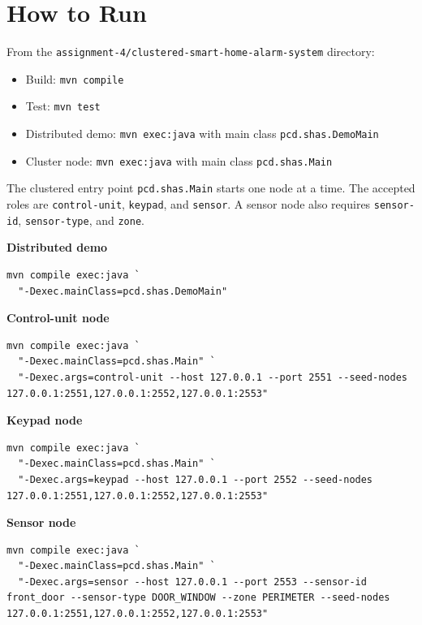 \clearpage
\section{How to Run}

From the \texttt{assignment-4/clustered-smart-home-alarm-system} directory:

\begin{itemize}
  \item Build: \texttt{mvn compile}
  \item Test: \texttt{mvn test}
  \item Distributed demo: \texttt{mvn exec:java} with main class \texttt{pcd.shas.DemoMain}
  \item Cluster node: \texttt{mvn exec:java} with main class \texttt{pcd.shas.Main}
\end{itemize}

The clustered entry point \texttt{pcd.shas.Main} starts one node at a time.
The accepted roles are \texttt{control-unit}, \texttt{keypad}, and
\texttt{sensor}. A sensor node also requires \texttt{sensor-id},
\texttt{sensor-type}, and \texttt{zone}.

\textbf{Distributed demo}
\begin{lstlisting}[style=terminalstyle]
mvn compile exec:java `
  "-Dexec.mainClass=pcd.shas.DemoMain"
\end{lstlisting}

\textbf{Control-unit node}
\begin{lstlisting}[style=terminalstyle]
mvn compile exec:java `
  "-Dexec.mainClass=pcd.shas.Main" `
  "-Dexec.args=control-unit --host 127.0.0.1 --port 2551 --seed-nodes 127.0.0.1:2551,127.0.0.1:2552,127.0.0.1:2553"
\end{lstlisting}

\textbf{Keypad node}
\begin{lstlisting}[style=terminalstyle]
mvn compile exec:java `
  "-Dexec.mainClass=pcd.shas.Main" `
  "-Dexec.args=keypad --host 127.0.0.1 --port 2552 --seed-nodes 127.0.0.1:2551,127.0.0.1:2552,127.0.0.1:2553"
\end{lstlisting}

\textbf{Sensor node}
\begin{lstlisting}[style=terminalstyle]
mvn compile exec:java `
  "-Dexec.mainClass=pcd.shas.Main" `
  "-Dexec.args=sensor --host 127.0.0.1 --port 2553 --sensor-id front_door --sensor-type DOOR_WINDOW --zone PERIMETER --seed-nodes 127.0.0.1:2551,127.0.0.1:2552,127.0.0.1:2553"
\end{lstlisting}

